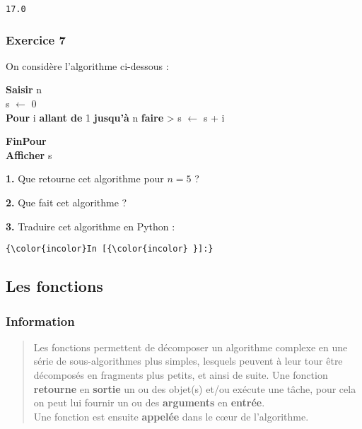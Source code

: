 \documentclass[11pt]{article}
\begin{document}
    \begin{Verbatim}[commandchars=\\\{\}]
17.0

    \end{Verbatim}

    \hypertarget{exercice-7}{%
\subsubsection{Exercice 7}\label{exercice-7}}

On considère l'algorithme ci-dessous :

\textbf{Saisir} n\\
s \(\leftarrow\) 0\\
\textbf{Pour} i \textbf{allant de} 1 \textbf{jusqu'à} n \textbf{faire}
\textgreater{} s \(\leftarrow\) s + i

\textbf{FinPour}\\
\textbf{Afficher} s

    \textbf{1.} Que retourne cet algorithme pour \(n=5\) ?

    

    \textbf{2.} Que fait cet algorithme ?

    

    \textbf{3.} Traduire cet algorithme en Python :

    \begin{Verbatim}[commandchars=\\\{\}]
{\color{incolor}In [{\color{incolor} }]:} 
\end{Verbatim}

    \hypertarget{les-fonctions}{%
\subsection{Les fonctions}\label{les-fonctions}}

\hypertarget{information}{%
\subsubsection{Information}\label{information}}

\begin{quote}
Les fonctions permettent de décomposer un algorithme complexe en une
série de sous-algorithmes plus simples, lesquels peuvent à leur tour
être décomposés en fragments plus petits, et ainsi de suite. Une
fonction \textbf{retourne} en \textbf{sortie} un ou des objet(s) et/ou
exécute une tâche, pour cela on peut lui fournir un ou des
\textbf{arguments} en \textbf{entrée}.\\
Une fonction est ensuite \textbf{appelée} dans le cœur de l'algorithme.
\end{quote}
\end{document}
